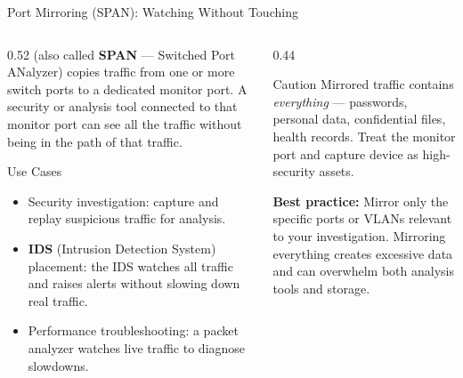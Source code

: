 \documentclass[aspectratio=169]{beamer}  %
\begin{document}
\begin{frame}{Port Mirroring (SPAN): Watching Without Touching}
    \begin{columns}[T]
        \begin{column}{0.52\textwidth}
            \footnotesize
             (also called \textbf{SPAN} --- Switched Port ANalyzer) copies traffic from one or more switch ports to a dedicated monitor port. A security or analysis tool connected to that monitor port can see all the traffic without being in the path of that traffic.

            \vspace{0.3em}
            \begin{exampleblock}{Use Cases}
                \footnotesize
                \begin{itemize}
                    \item Security investigation: capture and replay suspicious traffic for analysis.
                    \item \textbf{IDS} (Intrusion Detection System) placement: the IDS watches all traffic and raises alerts without slowing down real traffic.
                    \item Performance troubleshooting: a packet analyzer watches live traffic to diagnose slowdowns.
                \end{itemize}
            \end{exampleblock}
        \end{column}
        \begin{column}{0.44\textwidth}
            \begin{alertblock}{Caution}
                \footnotesize
                Mirrored traffic contains \emph{everything} --- passwords, personal data, confidential files, health records. Treat the monitor port and capture device as high-security assets.
            \end{alertblock}
            \vspace{0.3em}
            \footnotesize
            \textbf{Best practice:} Mirror only the specific ports or VLANs relevant to your investigation. Mirroring everything creates excessive data and can overwhelm both analysis tools and storage.
        \end{column}
    \end{columns}
\end{frame}
\end{document}
